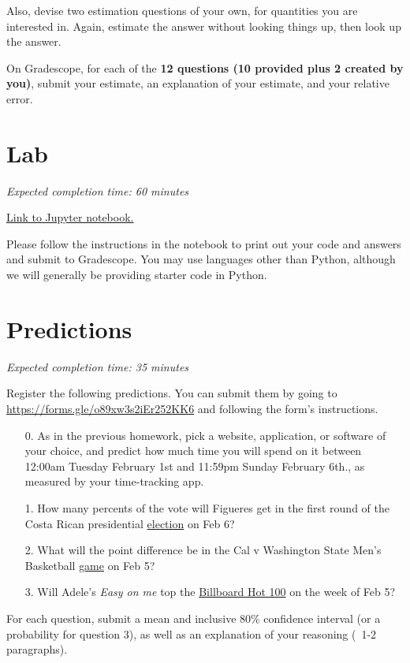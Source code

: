 \documentclass[11pt]{article}
\begin{document}
Also, devise two estimation questions of your own, for quantities you are interested in. Again, estimate the answer without looking things up, then look up the answer.

On Gradescope, for each of the \textbf{12 questions (10 provided plus 2 created by you)}, submit your estimate, an explanation of your estimate, and your relative error.


\section*{Lab}

\emph{Expected completion time: 60 minutes}

\href{https://datahub.berkeley.edu/hub/user-redirect/git-pull?repo=https%3A%2F%2Fgithub.com%2Fjs-d%2Fstat-157-260-website&urlpath=tree%2Fstat-157-260-website%2Fhw%2Fhw2%2Fhw2_lab.ipynb&branch=main}{Link to Jupyter notebook.} 

Please follow the instructions in the notebook to print out your code and answers and submit to Gradescope. You may use languages other than Python, although we will generally be providing starter code in Python.



\section*{Predictions}

\emph{Expected completion time: 35 minutes}

Register the following predictions. You can submit them by going to \url{https://forms.gle/o89xw3s2iEr252KK6} and following the form's instructions.

\begin{enumerate}
	\item[0.] As in the previous homework, pick a website, application, or software of your choice, and predict how much time you will spend on it between 12:00am Tuesday February 1st and 11:59pm Sunday February 6th., as measured by your time-tracking app.
	
	\item[1.] How many percents of the vote will Figueres get in the first round of the Costa Rican presidential \href{https://en.wikipedia.org/wiki/2022_Costa_Rican_general_election}{election} on Feb 6?
	
	\item[2.] What will the point difference be in the Cal v Washington State Men's Basketball \href{https://pac-12.com/mens-basketball/event/2022/02/05/washington-state-california}{game} on Feb 5?
	
	\item[3.] Will Adele's \textit{Easy on me} top the \href{https://www.billboard.com/charts/hot-100/}{Billboard Hot 100} on the week of Feb 5?
	
\end{enumerate}

For each question, submit a mean and inclusive 80\% confidence interval (or a probability for question 3), as well as an explanation of your reasoning (~1-2 paragraphs).
\end{document}
